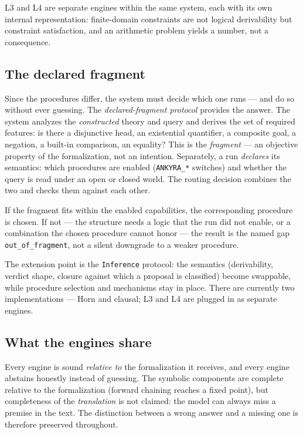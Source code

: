\documentclass[11pt,a4paper]{article}
\begin{document}
L3 and L4 are separate engines within the same system, each with its own internal
representation: finite-domain constraints are not logical derivability but constraint
satisfaction, and an arithmetic problem yields a number, not a consequence.

\subsection{The declared fragment}

Since the procedures differ, the system must decide which one runs --- and do so without
ever guessing. The \emph{declared-fragment protocol} provides the answer. The system
analyzes the \emph{constructed} theory and query and derives the set of required features:
is there a disjunctive head, an existential quantifier, a composite goal, a negation, a
built-in comparison, an equality? This is the \emph{fragment} --- an objective property of
the formalization, not an intention. Separately, a run \emph{declares} its semantics: which
procedures are enabled (\texttt{ANKYRA\_*} switches) and whether the query is read under an
open or closed world. The routing decision combines the two and checks them against each
other.

If the fragment fits within the enabled capabilities, the corresponding procedure is chosen.
If not --- the structure needs a logic that the run did not enable, or a combination the
chosen procedure cannot honor --- the result is the named gap \texttt{out\_of\_fragment},
not a silent downgrade to a weaker procedure.

The extension point is the \texttt{Inference} protocol: the semantics (derivability, verdict
shape, closure against which a proposal is classified) become swappable, while procedure
selection and mechanisms stay in place. There are currently two implementations --- Horn and
clausal; L3 and L4 are plugged in as separate engines.

\subsection{What the engines share}

Every engine is sound \emph{relative to} the formalization it receives, and every engine
abstains honestly instead of guessing. The symbolic components are complete relative to the
formalization (forward chaining reaches a fixed point), but completeness of the
\emph{translation} is not claimed: the model can always miss a premise in the text. The
distinction between a wrong answer and a missing one is therefore preserved throughout.
\end{document}
